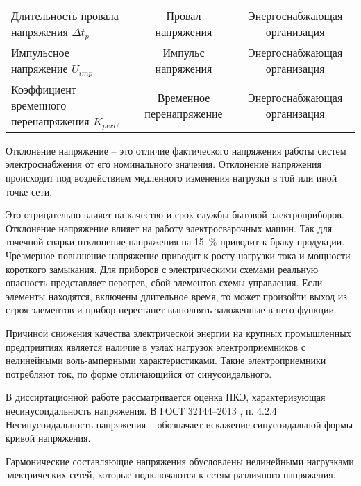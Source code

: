 \begin{table} [p]
\begin{SingleSpace}
\begin{tabulary}{\textwidth}{@{}>{\zz}L >{\zz}C >{\zz}C @{}}
			Длительность провала напряжения ${\Delta t_p}$ & %
			Провал напряжения &
			Энергоснабжающая организация \\
			
			Импульсное напряжение ${U_{imp}}$ &
			Импульс напряжения &
			Энергоснабжающая организация \\
			
			Коэффициент временного перенапряжения ${K_{per U}}$ &
			Временное перенапряжение &
			Энергоснабжающая организация \\
			
			\bottomrule %
		\end{tabulary}%
	\end{SingleSpace}
\end{table}

Отклонение напряжение -- это отличие фактического напряжения работы систем электроснабжения от его номинального значения. Отклонение напряжения происходит под воздействием медленного изменения нагрузки в той или иной точке сети. 

Это отрицательно влияет на качество и срок службы бытовой электроприборов. Отклонение напряжение влияет на работу электросварочных машин. Так для точечной сварки отклонение напряжения на 15~\% приводит к браку продукции. Чрезмерное повышение напряжение приводит к росту нагрузки тока и мощности короткого замыкания. Для приборов с электрическими схемами реальную опасность представляет перегрев, сбой элементов схемы управления. Если элементы находятся, включены длительное время, то может произойти выход из строя элементов и прибор перестанет выполнять заложенные в него функции.



Причиной снижения качества электрической энергии на крупных промышленных предприятиях является наличие в узлах нагрузок электроприемников с нелинейными воль-амперными характеристиками. \cite{планков2013учет, лютаревич2013вопросы}
Такие электроприемники потребляют ток, по форме отличающийся от синусоидального. 

В диссиртационной работе рассматривается оценка ПКЭ, характеризующая несинусоидальность напряжения. В ГОСТ 32144--2013 \cite{ГОСТ32144-2013}, п. 4.2.4 Несинусоидальность напряжения -- обозначает искажение синусоидальной формы кривой напряжения.

Гармонические составляющие напряжения обусловлены нелинейными нагрузками электрических сетей, которые подключаются к сетям различного напряжения. 

